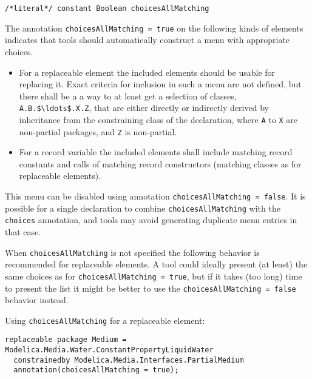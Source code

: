 \begin{annotationdefinition}[choicesAllMatching]
\begin{synopsis}\begin{lstlisting}
/*literal*/ constant Boolean choicesAllMatching
\end{lstlisting}\end{synopsis}
\begin{semantics}
The annotation \lstinline!choicesAllMatching = true! on the following kinds of elements indicates that tools should automatically construct a menu with appropriate choices.
\begin{itemize}
\item For a replaceable element the included elements should be usable for replacing it.
Exact criteria for inclusion in such a menu are not defined, but there shall be a a way to at least get a selection of classes, \lstinline!A.B.$\ldots$.X.Z!, that are either directly or indirectly derived by inheritance from the constraining class of the declaration, where \lstinline!A! to \lstinline!X! are non-partial packages, and \lstinline!Z! is non-partial.
\item For a record variable the included elements shall include matching record constants and calls of matching record constructors (matching classes as for replaceable elements).
\end{itemize}

This menu can be disabled using annotation \lstinline!choicesAllMatching = false!.
It is possible for a single declaration to combine \lstinline!choicesAllMatching! with the \lstinline!choices! annotation, and tools may avoid generating duplicate menu entries in that case.
\begin{nonnormative}
When \lstinline!choicesAllMatching! is not specified the following behavior is recommended for replaceable elements.
A tool could ideally present (at least) the same choices as for \lstinline!choicesAllMatching = true!, but if it takes (too long) time to present the list it might be better to use the \lstinline!choicesAllMatching = false! behavior instead.
\end{nonnormative}
\end{semantics}
\end{annotationdefinition}

\begin{example}
Using \lstinline!choicesAllMatching! for a replaceable element:
\begin{lstlisting}[language=modelica]
replaceable package Medium = Modelica.Media.Water.ConstantPropertyLiquidWater
  constrainedby Modelica.Media.Interfaces.PartialMedium
  annotation(choicesAllMatching = true);
\end{lstlisting}
\end{example}

